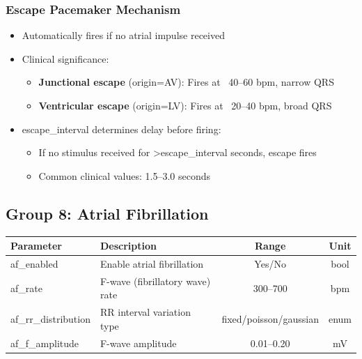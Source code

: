 \documentclass[11pt, a4paper]{article}
\begin{document}
\subsubsection{Escape Pacemaker Mechanism}
\begin{itemize}
    \item Automatically fires if no atrial impulse received
    \item Clinical significance:
    \begin{itemize}
        \item \textbf{Junctional escape} (origin=AV): Fires at ~40--60 bpm, narrow QRS
        \item \textbf{Ventricular escape} (origin=LV): Fires at ~20--40 bpm, broad QRS
    \end{itemize}
    \item escape\_interval determines delay before firing:
    \begin{itemize}
        \item If no stimulus received for >escape\_interval seconds, escape fires
        \item Common clinical values: 1.5--3.0 seconds
    \end{itemize}
\end{itemize}

\subsection{Group 8: Atrial Fibrillation}

\begin{tabularx}{\textwidth}{|l|X|c|c|}
\hline
\textbf{Parameter} & \textbf{Description} & \textbf{Range} & \textbf{Unit} \\
\hline
af\_enabled & Enable atrial fibrillation & Yes/No & bool \\
af\_rate & F-wave (fibrillatory wave) rate & 300--700 & bpm \\
af\_rr\_distribution & RR interval variation type & fixed/poisson/gaussian & enum \\
af\_f\_amplitude & F-wave amplitude & 0.01--0.20 & mV \\
\hline
\end{tabularx}
\end{document}
